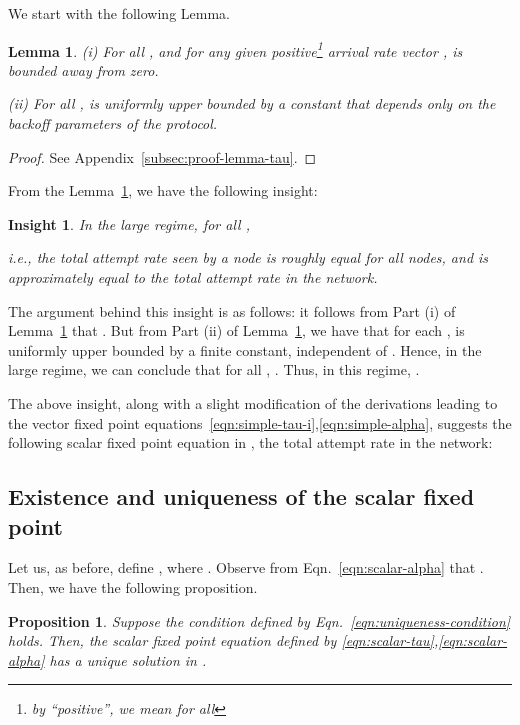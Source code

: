 \documentclass[12pt, draftclsnofoot, onecolumn]{IEEEtran}
\newtheorem{proposition}{Proposition}
\newtheorem{lemma}{Lemma}
\newtheorem{insight}{Insight}
\begin{document}
We start with the following Lemma. 
\begin{lemma}
\label{lem:tau}
(i) For all , and for any given positive\footnote{by ``positive'', we mean  for all } arrival rate vector ,  is bounded away from zero.

\noindent
(ii) For all ,  is uniformly upper bounded by a constant that depends only on the backoff parameters of the protocol. 
\end{lemma}
\begin{proof}
See Appendix~\ref{subsec:proof-lemma-tau}.
\end{proof}

From the Lemma~\ref{lem:tau}, we have the following insight:
\begin{insight}
\label{cor:equality}
In the large  regime, for all ,

i.e., the total attempt rate seen by a node is roughly equal for all nodes, and is approximately equal to the total attempt rate in the network.
\end{insight}

The argument behind this insight is as follows: it follows from Part (i) of Lemma~\ref{lem:tau} that . But from Part (ii) of Lemma~\ref{lem:tau}, we have that for each ,  is uniformly upper bounded by a finite constant, independent of . Hence, in the large  regime, we can conclude that for all , . Thus, in this regime, . 

The above insight, along with a slight modification of the derivations leading to the vector fixed point equations~\eqref{eqn:simple-tau-i},\eqref{eqn:simple-alpha}, suggests the following scalar fixed point equation in , the total attempt rate in the network:



\subsection{Existence and uniqueness of the scalar fixed point}
\label{subsec:scalar-uniqueness}

Let us, as before, define , where . Observe from Eqn.~\eqref{eqn:scalar-alpha} that . Then, we have the following proposition.

\begin{proposition}
\label{prop:scalar-uniqueness}
Suppose the condition defined by Eqn.~\eqref{eqn:uniqueness-condition} holds. Then, the scalar fixed point equation defined by \eqref{eqn:scalar-tau},\eqref{eqn:scalar-alpha} has a unique solution in . 
\end{proposition}
\end{document}
